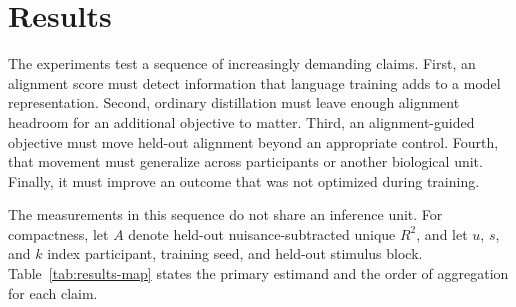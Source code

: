 \section{Results}

The experiments test a sequence of increasingly demanding claims.
First, an alignment score must detect information that language training adds to a model representation.
Second, ordinary distillation must leave enough alignment headroom for an additional objective to matter.
Third, an alignment-guided objective must move held-out alignment beyond an appropriate control.
Fourth, that movement must generalize across participants or another biological unit.
Finally, it must improve an outcome that was not optimized during training.

The measurements in this sequence do not share an inference unit.
For compactness, let $A$ denote held-out nuisance-subtracted unique $R^2$, and let $u$, $s$, and $k$ index participant, training seed, and held-out stimulus block.
Table~\ref{tab:results-map} states the primary estimand and the order of aggregation for each claim.

